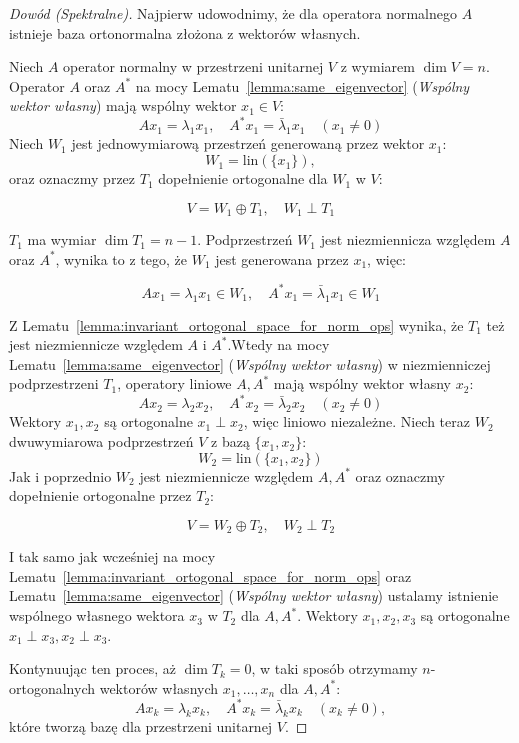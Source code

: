 \begin{proof}[Dowód (Spektralne)]
Najpierw udowodnimy, że dla operatora normalnego $A$ istnieje baza ortonormalna złożona z wektorów własnych.

Niech $A$ operator normalny w przestrzeni unitarnej $V$ z wymiarem $\dim{V} = n$.
Operator $A$ oraz $A^*$ na mocy Lematu~\ref{lemma:same_eigenvector} (\textit{Wspólny wektor własny}) mają wspólny wektor $x_1 \in V$:
$$Ax_1 = \lambda_1 x_1, \quad A^*x_1 = \bar{\lambda}_1 x_1 \quad (x_1 \neq 0)$$
Niech $W_1$ jest jednowymiarową przestrzeń generowaną przez wektor $x_1$: $$W_1 = \mathrm{lin}(\{x_1\}),$$ oraz oznaczmy przez $T_1$ dopełnienie ortogonalne dla $W_1$ w $V$:

$$ V = W_1 \oplus T_1, \quad W_1 \perp T_1$$

$T_1$ ma wymiar $\dim{T_1} = n - 1$.
Podprzestrzeń $W_1$ jest niezmiennicza względem $A$ oraz $A^*$, wynika to z tego, że $W_1$ jest generowana przez $x_1$, więc:

$$ Ax_1 = \lambda_1 x_1 \in W_1, \quad A^*x_1 = \bar{\lambda}_1 x_1 \in W_1 $$

Z Lematu~\ref{lemma:invariant_ortogonal_space_for_norm_ops} wynika, że $T_1$ też jest niezmiennicze względem $A$ i $A^*$.Wtedy na mocy Lematu~\ref{lemma:same_eigenvector} (\textit{Wspólny wektor własny}) w niezmienniczej podprzestrzeni  $T_1$, operatory liniowe $A, A^*$ mają wspólny wektor własny $x_2$:
$$Ax_2 = \lambda_2 x_2, \quad A^*x_2 = \bar{\lambda}_2 x_2 \quad (x_2 \neq 0)$$
Wektory $x_1, x_2$ są ortogonalne $x_1 \perp x_2$, więc liniowo niezależne. Niech teraz $W_2$ dwuwymiarowa podprzestrzeń $V$ z bazą $\{x_1, x_2\}$:
$$ W_2 = \mathrm{lin}(\{x_1, x_2\}) $$
Jak i poprzednio $W_2$ jest niezmiennicze względem $A, A^*$ oraz oznaczmy dopełnienie ortogonalne przez $T_2$:

$$ V = W_2 \oplus T_2, \quad W_2 \perp T_2 $$

I tak samo jak wcześniej na mocy Lematu~\ref{lemma:invariant_ortogonal_space_for_norm_ops} oraz Lematu~\ref{lemma:same_eigenvector} (\textit{Wspólny wektor własny}) ustalamy istnienie wspólnego własnego wektora $x_3$ w $T_2$ dla $A, A^*$. 
Wektory $x_1, x_2, x_3$ są ortogonalne $x_1 \perp x_3, x_2 \perp x_3$.

Kontynuując ten proces, aż $\dim{T_k} = 0$, w taki sposób otrzymamy $n$-ortogonalnych wektorów własnych $x_1, \ldots, x_n$ dla $A, A^*$:
$$Ax_k = \lambda_k x_k, \quad A^*x_k = \bar{\lambda}_k x_k \quad (x_k \neq 0),$$
które tworzą bazę dla przestrzeni unitarnej $V$.


\end{proof}
